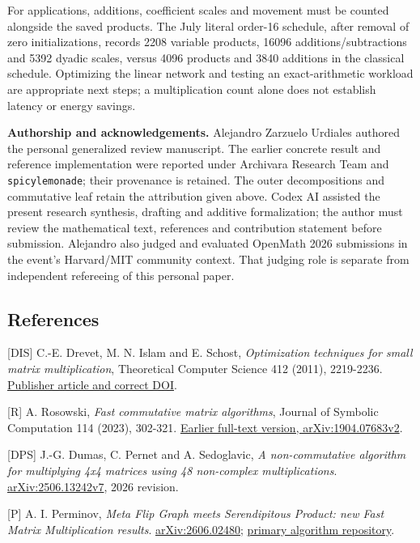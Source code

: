 \documentclass[
  11pt,
]{article}
\begin{document}
For applications, additions, coefficient scales and movement must be
counted alongside the saved products. The July literal order-16
schedule, after removal of zero initializations, records 2208 variable
products, 16096 additions/subtractions and 5392 dyadic scales, versus
4096 products and 3840 additions in the classical schedule. Optimizing
the linear network and testing an exact-arithmetic workload are
appropriate next steps; a multiplication count alone does not establish
latency or energy savings.

\textbf{Authorship and acknowledgements.} Alejandro Zarzuelo Urdiales
authored the personal generalized review manuscript. The earlier
concrete result and reference implementation were reported under
Archivara Research Team and \texttt{spicylemonade}; their provenance is
retained. The outer decompositions and commutative leaf retain the
attribution given above. Codex AI assisted the present research
synthesis, drafting and additive formalization; the author must review
the mathematical text, references and contribution statement before
submission. Alejandro also judged and evaluated OpenMath 2026
submissions in the event's Harvard/MIT community context. That judging
role is separate from independent refereeing of this personal paper.

\subsection{References}\label{references}

{[}DIS{]} C.-E. Drevet, M. N. Islam and E. Schost, \emph{Optimization
techniques for small matrix multiplication}, Theoretical Computer
Science 412 (2011), 2219-2236.
\href{https://doi.org/10.1016/j.tcs.2010.12.012}{Publisher article and
correct DOI}.

{[}R{]} A. Rosowski, \emph{Fast commutative matrix algorithms}, Journal
of Symbolic Computation 114 (2023), 302-321.
\href{https://arxiv.org/abs/1904.07683v2}{Earlier full-text version,
arXiv:1904.07683v2}.

{[}DPS{]} J.-G. Dumas, C. Pernet and A. Sedoglavic, \emph{A
non-commutative algorithm for multiplying 4x4 matrices using 48
non-complex multiplications}.
\href{https://arxiv.org/abs/2506.13242v7}{arXiv:2506.13242v7}, 2026
revision.

{[}P{]} A. I. Perminov, \emph{Meta Flip Graph meets Serendipitous
Product: new Fast Matrix Multiplication results}.
\href{https://arxiv.org/abs/2606.02480}{arXiv:2606.02480};
\href{https://github.com/dronperminov/FastMatrixMultiplication}{primary
algorithm repository}.
\end{document}
